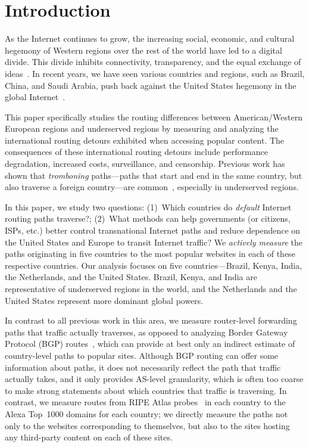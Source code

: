 \section{Introduction}
\label{sec:intro}

As the Internet continues to grow, the increasing social, economic, and cultural 
hegemony of Western regions over the rest of the world have led to a digital divide.  This 
divide inhibits connectivity, transparency, and the equal exchange of ideas~\cite{hegemony}. In 
recent years, we have seen various countries and regions, such as Brazil, China, and Saudi Arabia, push back against the United States hegemony in the global Internet~\cite{hegemony2, hegemony_china,
hegemony_EU}.  

This paper specifically studies the routing differences between American/Western European regions and 
underserved regions by measuring and analyzing the international routing detours exhibited when 
accessing popular content. The consequences of these international routing detours include performance 
degradation, increased costs, surveillance, and censorship.  Previous work has shown that {\it tromboning}
paths---paths that start and end in the same country, but also traverse a
foreign country---are common~\cite{shah2015characterizing,gupta2014peering}, especially in 
underserved regions.  

In this paper, we study two questions: (1)~Which countries do {\em   default}
Internet routing paths traverse?; (2)~What methods can  help governments (or citizens, 
ISPs, etc.) better control transnational Internet paths and reduce dependence on the United States and 
Europe to transit Internet traffic?  We {\em actively
measure} the paths originating in five countries to the most popular
websites in each of these respective countries.
Our analysis focuses on five countries---Brazil,
Kenya, India, the Netherlands, and the United States. Brazil, Kenya, and India are representative of 
underserved regions in the world, and the Netherlands and the United States represent 
more dominant global powers.   

In contrast to all previous work in this area, we measure router-level
forwarding paths that traffic actually traverses, as opposed to analyzing Border
Gateway Protocol (BGP)
routes~\cite{karlin2009nation,shah2015characterizing}, which can provide at
best only an indirect estimate of country-level paths to popular sites.
Although BGP routing can offer some information about paths, it does not
necessarily reflect the path that traffic actually takes, and it only provides
AS-level granularity, which is often too coarse to make strong statements
about which countries that traffic is traversing.  In contrast, we measure
routes from RIPE Atlas probes~\cite{ripe_atlas} in each country to the Alexa
Top~1000 domains for each country; we directly measure the paths not only to
the websites corresponding to themselves, but also to the sites hosting any
third-party content on each of these sites.

